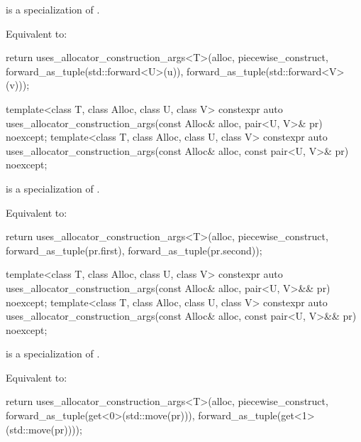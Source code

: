 \begin{itemdescr}
\pnum
\constraints
{} is a specialization of .

\pnum
\effects
Equivalent to:
\begin{codeblock}
return uses_allocator_construction_args<T>(alloc, piecewise_construct,
                                           forward_as_tuple(std::forward<U>(u)),
                                           forward_as_tuple(std::forward<V>(v)));
\end{codeblock}
\end{itemdescr}

%
\begin{itemdecl}
template<class T, class Alloc, class U, class V>
  constexpr auto uses_allocator_construction_args(const Alloc& alloc,
                                                  pair<U, V>& pr) noexcept;
template<class T, class Alloc, class U, class V>
  constexpr auto uses_allocator_construction_args(const Alloc& alloc,
                                                  const pair<U, V>& pr) noexcept;
\end{itemdecl}

\begin{itemdescr}
\pnum
\constraints
{} is a specialization of .

\pnum
\effects
Equivalent to:
\begin{codeblock}
return uses_allocator_construction_args<T>(alloc, piecewise_construct,
                                           forward_as_tuple(pr.first),
                                           forward_as_tuple(pr.second));
\end{codeblock}
\end{itemdescr}

%
\begin{itemdecl}
template<class T, class Alloc, class U, class V>
  constexpr auto uses_allocator_construction_args(const Alloc& alloc,
                                                  pair<U, V>&& pr) noexcept;
template<class T, class Alloc, class U, class V>
  constexpr auto uses_allocator_construction_args(const Alloc& alloc,
                                                  const pair<U, V>&& pr) noexcept;
\end{itemdecl}

\begin{itemdescr}
\pnum
\constraints
{} is a specialization of .

\pnum
\effects
Equivalent to:
\begin{codeblock}
return uses_allocator_construction_args<T>(alloc, piecewise_construct,
                                           forward_as_tuple(get<0>(std::move(pr))),
                                           forward_as_tuple(get<1>(std::move(pr))));
\end{codeblock}
\end{itemdescr}

